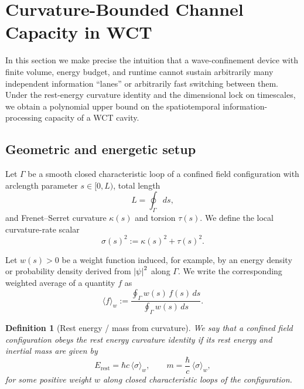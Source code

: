 \documentclass[12pt]{article}
\newtheorem{definition}[theorem]{Definition}
\begin{document}

\section{Curvature-Bounded Channel Capacity in WCT}
\label{sec:curvature_capacity}

In this section we make precise the intuition that a wave-confinement device with finite volume, energy budget, and runtime cannot sustain arbitrarily many independent information ``lanes'' or arbitrarily fast switching between them. Under the rest-energy curvature identity and the dimensional lock on timescales, we obtain a polynomial upper bound on the spatiotemporal information-processing capacity of a WCT cavity.

\subsection{Geometric and energetic setup}

Let $\Gamma$ be a smooth closed characteristic loop of a confined field configuration with arclength parameter $s \in [0,L)$, total length
\[
L = \oint_\Gamma ds,
\]
and Frenet--Serret curvature $\kappa(s)$ and torsion $\tau(s)$. We define the local curvature-rate scalar
\begin{equation}
  \sigma(s)^2 := \kappa(s)^2 + \tau(s)^2.
\end{equation}

Let $w(s) > 0$ be a weight function induced, for example, by an energy density or probability density derived from $\abs{\psi}^2$ along $\Gamma$. We write the corresponding weighted average of a quantity $f$ as
\begin{equation}
  \label{eq:weighted_average}
  \langle f \rangle_w
  := \frac{\displaystyle \oint_\Gamma w(s)\,f(s)\,ds}{\displaystyle \oint_\Gamma w(s)\,ds}.
\end{equation}

\begin{definition}[Rest energy / mass from curvature]
\label{def:rest_energy_curvature}
We say that a confined field configuration obeys the \emph{rest energy curvature identity} if its rest energy and inertial mass are given by
\begin{equation}
  \label{eq:rest_energy_identity}
  E_{\mathrm{rest}} = \hbar c\,\langle \sigma \rangle_w,
  \qquad
  m = \frac{\hbar}{c}\,\langle \sigma \rangle_w,
\end{equation}
for some positive weight $w$ along closed characteristic loops of the configuration.
\end{definition}
\end{document}
